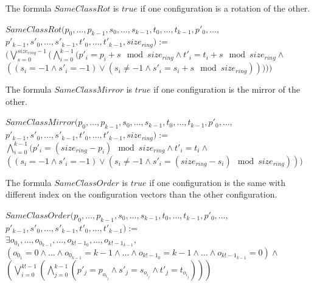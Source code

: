 \documentclass{article}
\begin{document}
\noindent The formula $SameClassRot$ is $true$ if one configuration is a rotation of the other.

\begin{center}
    
$SameClassRot(p_{0}, \dots, p_{k-1}, s_{0}, \dots, s_{k-1}, t_{0}, \dots, t_{k-1}, p'_{0}, \dots,$\\
$p'_{k-1}, s'_{0}, \dots, s'_{k-1}, t'_{0}, \dots, t'_{k-1}, size_{ring}):=$\\
$(\bigvee_{s=0}^{size_{ring}-1} ( \bigwedge_{i=0}^{k-1} (p'_{i} = p_{i}+s \mod{size_{ring}} \land t'_{i} = t_{i}+s \mod{size_{ring}} \land$\\
$((s_{i} = -1 \land s'_{i} = -1) \lor (s_{i} \not= -1 \land s'_{i} = s_{i}+s \mod{size_{ring}}) ) ) ))$
\end{center}

\noindent The formula $SameClassMirror$ is $true$ if one configuration is the mirror of the other.

\begin{center}
    
    $SameClassMirror(p_{0}, \dots, p_{k-1}, s_{0}, \dots, s_{k-1}, t_{0}, \dots, t_{k-1}, p'_{0}, \dots,$\\
    $p'_{k-1}, s'_{0}, \dots, s'_{k-1}, t'_{0}, \dots, t'_{k-1}, size_{ring}):=$\\
    $\bigwedge_{i=0}^{k-1}( p'_{i} = (size_{ring} - p_{i})\mod{size_{ring}} \land t'_{i} = t_{i} \land$ \\
    $((s_{i} = -1 \land s'_{i} = -1) \lor (s_{i} \not= -1 \land s'_{i} = (size_{ring} - s_{i})\mod{size_{ring}}))) $
\end{center}

\noindent The formula $SameClassOrder$ is $true$ if one configuration is the same with different index on the configuration vectors than the other configuration.

\begin{center}
    
    $SameClassOrder(p_{0}, \dots, p_{k-1}, s_{0}, \dots, s_{k-1}, t_{0}, \dots, t_{k-1}, p'_{0}, \dots,$\\
    $p'_{k-1}, s'_{0}, \dots, s'_{k-1}, t'_{0}, \dots, t'_{k-1}):=$\\
    $\exists o_{0_{1}},\dots, o_{0_{k-1}}, \dots, o_{k!-1_{0}}, \dots, o_{k!-1_{k-1}},$\\
    $( o_{0_{1}} = 0 \land \dots \land o_{0_{k-1}} = k-1 \land \dots \land o_{k!-1_{0}} = k-1 \land \dots \land o_{k!-1_{k-1}} = 0 ) \land $\\
    $(\bigvee_{i=0}^{k!-1} (\bigwedge_{j=0}^{k-1} (p'_{j} = p_{o_{i_{j}}} \land s'_{j} = s_{o_{i_{j}}} \land t'_{j} = t_{o_{i_{j}}}  ) ) )$
\end{center}
\end{document}
